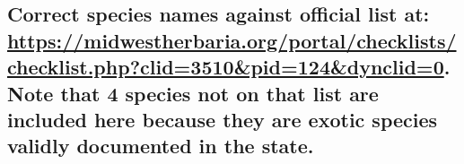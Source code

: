 \documentclass[
]{article}
\begin{document}
\hypertarget{correct-species-names-against-official-list-at-httpsmidwestherbaria.orgportalchecklistschecklist.phpclid3510pid124dynclid0.-note-that-4-species-not-on-that-list-are-included-here-because-they-are-exotic-species-validly-documented-in-the-state.}{%
\subsection{\texorpdfstring{Correct species names against official list
at:
\url{https://midwestherbaria.org/portal/checklists/checklist.php?clid=3510\&pid=124\&dynclid=0}.
Note that 4 species not on that list are included here because they are
exotic species validly documented in the
state.}{Correct species names against official list at: https://midwestherbaria.org/portal/checklists/checklist.php?clid=3510\&pid=124\&dynclid=0. Note that 4 species not on that list are included here because they are exotic species validly documented in the state.}}\label{correct-species-names-against-official-list-at-httpsmidwestherbaria.orgportalchecklistschecklist.phpclid3510pid124dynclid0.-note-that-4-species-not-on-that-list-are-included-here-because-they-are-exotic-species-validly-documented-in-the-state.}}
\end{document}
